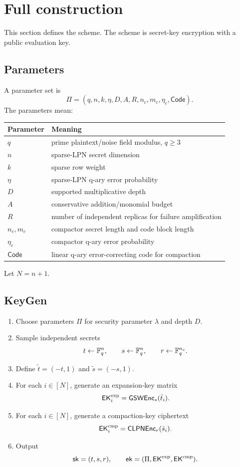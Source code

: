 \section{Full construction}

This section defines the \sable{} scheme.  The scheme is secret-key encryption with a public evaluation key.

\subsection{Parameters}

A parameter set is
\[
    \Pi=(q,n,k,\eta,D,A,R,n_c,m_c,\eta_c,\mathsf{Code}).
\]
The parameters mean:
\begin{center}
\begin{tabular}{ll}
\toprule
Parameter & Meaning\\
\midrule
$q$ & prime plaintext/noise field modulus, $q\ge 3$\\
$n$ & sparse-LPN secret dimension\\
$k$ & sparse row weight\\
$\eta$ & sparse-LPN q-ary error probability\\
$D$ & supported multiplicative depth\\
$A$ & conservative addition/monomial budget\\
$R$ & number of independent replicas for failure amplification\\
$n_c,m_c$ & compactor secret length and code block length\\
$\eta_c$ & compactor q-ary error probability\\
$\mathsf{Code}$ & linear q-ary error-correcting code for compaction\\
\bottomrule
\end{tabular}
\end{center}
Let $N=n+1$.

\subsection{KeyGen}

\begin{algobox}
\AlgTitle{$\KeyGen$}
\begin{enumerate}
    \item Choose parameters $\Pi$ for security parameter $\lambda$ and depth $D$.
    \item Sample independent secrets
    \[
        t\leftarrow\mathbb{F}_q^n,\qquad s\leftarrow\mathbb{F}_q^n,
        \qquad r\leftarrow\mathbb{F}_q^{n_c}.
    \]
    \item Define $\tilde{t}=(-t,1)$ and $\tilde{s}=(-s,1)$.
    \item For each $i\in[N]$, generate an expansion-key matrix
    \[
        \mathsf{EK}^{\rm exp}_i=\mathsf{GSW}\mathsf{Enc}_s(\tilde{t}_i).
    \]
    \item For each $i\in[N]$, generate a compaction-key ciphertext
    \[
        \mathsf{EK}^{\rm cmp}_i=\mathsf{CLPN}\mathsf{Enc}_r(\tilde{s}_i).
    \]
    \item Output
    \[
        \mathsf{sk}=(t,s,r),
        \qquad
        \mathsf{ek}=(\Pi,\mathsf{EK}^{\rm exp},\mathsf{EK}^{\rm cmp}).
    \]
\end{enumerate}
\end{algobox}

